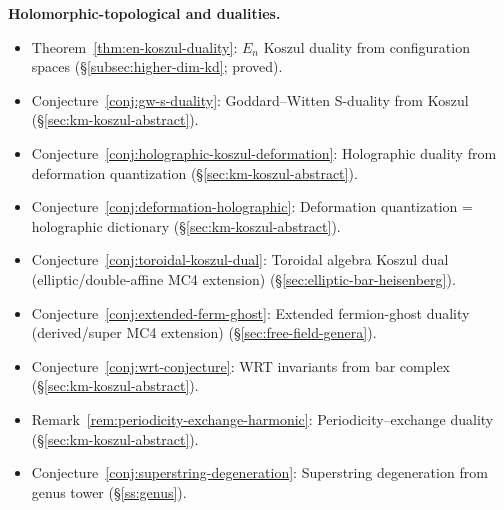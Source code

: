 \smallskip
\noindent\textbf{Holomorphic-topological and dualities.}
\begin{itemize}[nosep]
\item Theorem~\ref{thm:en-koszul-duality}:
  $E_n$ Koszul duality from configuration spaces
  (\S\ref{subsec:higher-dim-kd}; proved).

\item Conjecture~\ref{conj:gw-s-duality}:
  Goddard--Witten S-duality from Koszul
  (\S\ref{sec:km-koszul-abstract}).

\item Conjecture~\ref{conj:holographic-koszul-deformation}:
  Holographic duality from deformation quantization
  (\S\ref{sec:km-koszul-abstract}).

\item Conjecture~\ref{conj:deformation-holographic}:
  Deformation quantization = holographic dictionary
  (\S\ref{sec:km-koszul-abstract}).

\item Conjecture~\ref{conj:toroidal-koszul-dual}:
  Toroidal algebra Koszul dual \textup{(}elliptic/double-affine MC4 extension\textup{)}
  (\S\ref{sec:elliptic-bar-heisenberg}).
\item Conjecture~\ref{conj:extended-ferm-ghost}:
  Extended fermion-ghost duality \textup{(}derived/super MC4 extension\textup{)}
  (\S\ref{sec:free-field-genera}).
\item Conjecture~\ref{conj:wrt-conjecture}:
  WRT invariants from bar complex
  (\S\ref{sec:km-koszul-abstract}).
\item Remark~\ref{rem:periodicity-exchange-harmonic}:
  Periodicity--exchange duality
  (\S\ref{sec:km-koszul-abstract}).
\item Conjecture~\ref{conj:superstring-degeneration}:
  Superstring degeneration from genus tower
  (\S\ref{ss:genus}).
\end{itemize}
